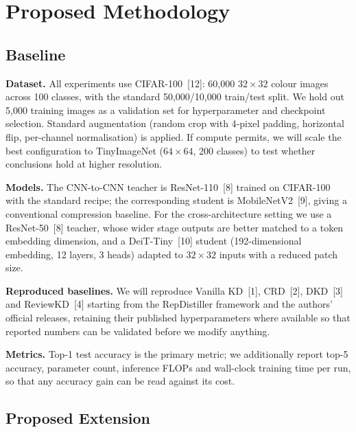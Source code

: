 \documentclass[11pt, letterpaper]{article}
\begin{document}
\section{Proposed Methodology}

\subsection{Baseline}

\textbf{Dataset.} All experiments use CIFAR-100~[12]: 60{,}000 $32\times32$ colour
images across 100 classes, with the standard 50{,}000/10{,}000 train/test split.
We hold out 5{,}000 training images as a validation set for hyperparameter and
checkpoint selection. Standard augmentation (random crop with 4-pixel padding,
horizontal flip, per-channel normalisation) is applied. If compute permits, we
will scale the best configuration to TinyImageNet ($64\times64$, 200 classes) to
test whether conclusions hold at higher resolution.

\textbf{Models.} The CNN-to-CNN teacher is ResNet-110~[8] trained on CIFAR-100 with
the standard recipe; the corresponding student is MobileNetV2~[9], giving a
conventional compression baseline. For the cross-architecture setting we use a
ResNet-50~[8] teacher, whose wider stage outputs are better matched to a token
embedding dimension, and a DeiT-Tiny~[10] student (192-dimensional embedding, 12
layers, 3 heads) adapted to $32\times32$ inputs with a reduced patch size.

\textbf{Reproduced baselines.} We will reproduce Vanilla KD~[1], CRD~[2],
DKD~[3] and ReviewKD~[4] starting from the RepDistiller framework and the
authors' official releases, retaining their published hyperparameters where
available so that reported numbers can be validated before we modify anything.

\textbf{Metrics.} Top-1 test accuracy is the primary metric; we additionally
report top-5 accuracy, parameter count, inference FLOPs and wall-clock training
time per run, so that any accuracy gain can be read against its cost.

\subsection{Proposed Extension}
\end{document}
